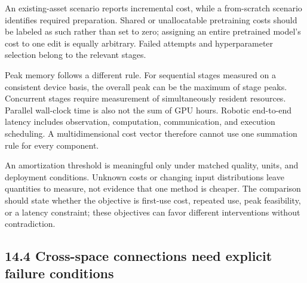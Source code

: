 An existing-asset scenario reports incremental cost, while a from-scratch scenario identifies required preparation. Shared or unallocatable pretraining costs should be labeled as such rather than set to zero; assigning an entire pretrained model's cost to one edit is equally arbitrary. Failed attempts and hyperparameter selection belong to the relevant stages.


Peak memory follows a different rule. For sequential stages measured on a consistent device basis, the overall peak can be the maximum of stage peaks. Concurrent stages require measurement of simultaneously resident resources. Parallel wall-clock time is also not the sum of GPU hours. Robotic end-to-end latency includes observation, computation, communication, and execution scheduling. A multidimensional cost vector therefore cannot use one summation rule for every component.


An amortization threshold is meaningful only under matched quality, units, and deployment conditions. Unknown costs or changing input distributions leave quantities to measure, not evidence that one method is cheaper. The comparison should state whether the objective is first-use cost, repeated use, peak feasibility, or a latency constraint; these objectives can favor different interventions without contradiction.


\subsection*{14.4 Cross-space connections need explicit failure conditions}

\begingroup\small\setlength{\tabcolsep}{5pt}\renewcommand{\arraystretch}{1.18}

